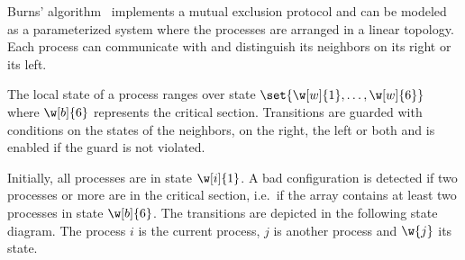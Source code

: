 Burns' algorithm~\cite{Burns:protocol} implements a mutual exclusion
protocol and can be modeled as a parameterized system where the
processes are arranged in a linear topology. Each process can
communicate with and distinguish its neighbors on its right or its
left.

The local state of a process ranges over state
$\set{\w[w]{1},\ldots,\w[w]{6}}$ where $\w[b]{6}$ represents the
critical section. Transitions are guarded with conditions on the
states of the neighbors, on the right, the left or both and is enabled
if the guard is not violated.

\noindent%
%
%   
{\centering %
  \begin{minipage}{0.7\linewidth}
    
  \end{minipage}%
  \par%
}%
%

Initially, all processes are in state $\w[i]{1}$. A bad configuration
is detected if two processes or more are in the critical section,
i.e.\ if the array contains at least two processes in state $\w[b]{6}$.
%
The transitions are depicted in the following state diagram.
%
The process $i$ is the current process, $j$ is another process and
$\w{j}$ its state.

